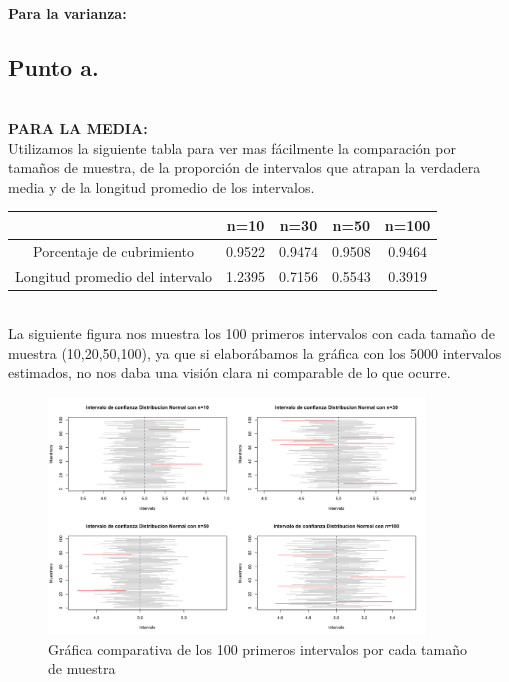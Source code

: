 \documentclass[letterpaper,12pt,onecolumn,titlepage]{article}
\begin{document}
~\\ \textbf{Para la varianza:}
\subsection{Punto a.}
~\\ \textbf{PARA LA MEDIA:}
~\\ Utilizamos la siguiente tabla para ver mas f\'{a}cilmente la comparaci\'{o}n por tama\~{n}os de muestra, de la proporci\'{o}n de intervalos que atrapan la verdadera media y de la longitud promedio de los intervalos.
\begin{center}
\begin{tabular}{|c|c|c|c|c|}
\hline 
\rule[-1ex]{0pt}{2.5ex}  & n=10 & n=30 & n=50 & n=100 \\ 
\hline 
\rule[-1ex]{0pt}{2.5ex} Porcentaje de cubrimiento & 0.9522 & 0.9474 & 0.9508 & 0.9464 \\ 
\hline 
\rule[-1ex]{0pt}{2.5ex} Longitud promedio del intervalo & 1.2395 & 0.7156 & 0.5543 & 0.3919 \\ 
\hline 
\end{tabular} 
\end{center}

~\\ \pagebreak La siguiente figura nos muestra los 100 primeros intervalos con cada tama\~{n}o de muestra (10,20,50,100), ya que si elabor\'{a}bamos la gr\'{a}fica con los 5000 intervalos estimados, no nos daba una visi\'{o}n clara ni comparable de lo que ocurre. 
~\\ \begin{figure}[!h]
    \begin{center}
        \includegraphics[width=10cm]{Figuras/Punto1.png}
        \caption{Gr\'{a}fica comparativa de los 100 primeros intervalos por cada tama\~{n}o de muestra}
        \label{fig:Densidad}
    \end{center}
\end{figure}
\end{document}
